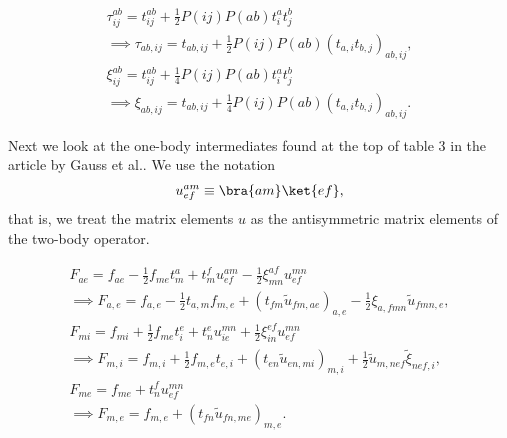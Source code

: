        \begin{gather}
            \tau^{ab}_{ij} = t^{ab}_{ij}
            + \frac{1}{2}P(ij)P(ab)t^{a}_{i} t^{b}_{j}
            \\
            \implies \tau_{ab, ij} = t_{ab, ij}
            + \frac{1}{2}P(ij)P(ab)\left(t_{a, i} t_{b, j}\right)_{ab, ij},
            \\
            \xi^{ab}_{ij} = t^{ab}_{ij}
            + \frac{1}{4}P(ij)P(ab)t^{a}_{i}t^{b}_{j}
            \\
            \implies
            \xi_{ab, ij} = t_{ab, ij}
            + \frac{1}{4}P(ij)P(ab)\left(t_{a, i} t_{b, j}\right)_{ab, ij}.
        \end{gather}

        Next we look at the one-body intermediates found at the top of table 3
        in the article by Gauss et al.\cite{gauss1995coupled}. We use the
        notation
        \begin{align}
            u^{am}_{ef} \equiv \bra{am}\ket{ef},
        \end{align}
        that is, we treat the matrix elements $u$ as the antisymmetric matrix
        elements of the two-body operator.

        \begin{gather}
            F_{ae} = f_{ae}
            - \frac{1}{2}f_{me}t^{a}_{m}
            + t^{f}_{m}u^{am}_{ef}
            - \frac{1}{2}\xi^{af}_{mn}u^{mn}_{ef}
            \\
            \implies
            F_{a, e} = f_{a, e}
            - \frac{1}{2}t_{a, m}f_{m, e}
            + \left(t_{fm}\tilde{u}_{fm, ae}\right)_{a, e}
            - \frac{1}{2}\xi_{a, fmn}\tilde{u}_{fmn, e},
            \\
            F_{mi} = f_{mi} + \frac{1}{2}f_{me}t^{e}_{i}
            + t^{e}_{n}u^{mn}_{ie}
            + \frac{1}{2}\xi^{ef}_{in}u^{mn}_{ef}
            \\
            \implies
            F_{m, i} = f_{m, i}
            + \frac{1}{2}f_{m, e} t_{e, i}
            + \left(t_{en}\tilde{u}_{en, mi}\right)_{m, i}
            + \frac{1}{2}\tilde{u}_{m, nef}\tilde{\xi}_{nef, i},
            \\
            F_{me} = f_{me} + t^{f}_{n}u^{mn}_{ef}
            \\
            \implies
            F_{m, e} = f_{m, e}
            + \left(t_{fn}\tilde{u}_{fn, me}\right)_{m, e}.
        \end{gather}
